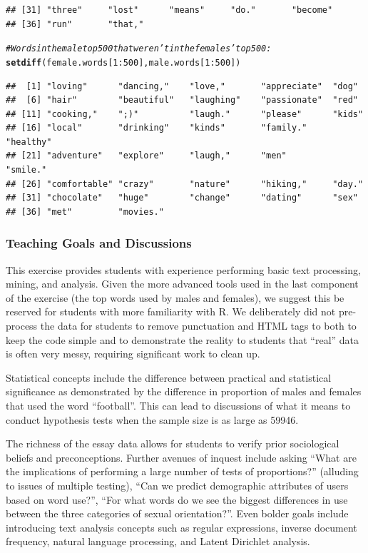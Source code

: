 \documentclass{article}\usepackage[]{graphicx}\usepackage[]{color}
\makeatletter
\newcommand{\hlnum}[1]{\textcolor[rgb]{0.686,0.059,0.569}{#1}}%
\newcommand{\hlcom}[1]{\textcolor[rgb]{0.678,0.584,0.686}{\textit{#1}}}%
\newcommand{\hlopt}[1]{\textcolor[rgb]{0,0,0}{#1}}%
\newcommand{\hlstd}[1]{\textcolor[rgb]{0.345,0.345,0.345}{#1}}%
\newcommand{\hlkwd}[1]{\textcolor[rgb]{0.737,0.353,0.396}{\textbf{#1}}}%
\newenvironment{kframe}{%
 \def\at@end@of@kframe{}%
 \ifinner\ifhmode%
  \def\at@end@of@kframe{\end{minipage}}%
  \begin{minipage}{\columnwidth}%
 \fi\fi%
 \def\FrameCommand##1{\hskip\@totalleftmargin \hskip-\fboxsep
 \colorbox{shadecolor}{##1}\hskip-\fboxsep
     \hskip-\linewidth \hskip-\@totalleftmargin \hskip\columnwidth}%
 \MakeFramed {\advance\hsize-\width
   \@totalleftmargin\z@ \linewidth\hsize
   \@setminipage}}%
 {\par\unskip\endMakeFramed%
 \at@end@of@kframe}
\newenvironment{knitrout}{}{} %
\makeatother
\begin{document}
\begin{knitrout}
\begin{kframe}
\begin{verbatim}
## [31] "three"     "lost"      "means"     "do."       "become"   
## [36] "run"       "that,"
\end{verbatim}
\begin{alltt}
\hlcom{# Words in the male top 500 that weren't in the females' top 500:}
\hlkwd{setdiff}\hlstd{(female.words[}\hlnum{1}\hlopt{:}\hlnum{500}\hlstd{], male.words[}\hlnum{1}\hlopt{:}\hlnum{500}\hlstd{])}
\end{alltt}
\begin{verbatim}
##  [1] "loving"      "dancing,"    "love,"       "appreciate"  "dog"        
##  [6] "hair"        "beautiful"   "laughing"    "passionate"  "red"        
## [11] "cooking,"    ";)"          "laugh."      "please"      "kids"       
## [16] "local"       "drinking"    "kinds"       "family."     "healthy"    
## [21] "adventure"   "explore"     "laugh,"      "men"         "smile."     
## [26] "comfortable" "crazy"       "nature"      "hiking,"     "day."       
## [31] "chocolate"   "huge"        "change"      "dating"      "sex"        
## [36] "met"         "movies."
\end{verbatim}
\end{kframe}
\end{knitrout}




\subsubsection{Teaching Goals and Discussions}
This exercise provides students with experience performing basic text processing, mining, and analysis.  Given the more advanced tools used in the last component of the exercise (the top words used by males and females), we suggest this be reserved for students with more familiarity with R.  We deliberately did not pre-process the data for students to remove punctuation and HTML tags to both to keep the code simple and to demonstrate the reality to students that ``real'' data is often very messy, requiring significant work to clean up.

Statistical concepts include the difference between practical and statistical significance as demonstrated by the difference in proportion of males and females that used the word ``football''.  This can lead to discussions of what it means to conduct hypothesis tests when the sample size is as large as 59946.

The richness of the essay data allows for students to verify prior sociological beliefs and preconceptions.  Further avenues of inquest include asking ``What are the implications of performing a large number of tests of proportions?'' (alluding to issues of multiple testing), ``Can we predict demographic attributes of users based on word use?'',  ``For what words do we see the biggest differences in use between the three categories of sexual orientation?''.  Even bolder goals include introducing text analysis concepts such as regular expressions, inverse document frequency, natural language processing, and Latent Dirichlet analysis\cite{LDA:2003}.
\end{document}
